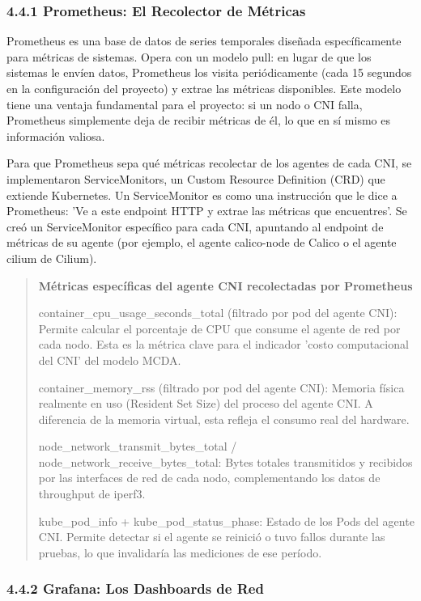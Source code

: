 \documentclass[journal]{IEEEtran}
\begin{document}
\subsubsection{4.4.1 Prometheus: El Recolector de Métricas}

Prometheus es una base de datos de series temporales diseñada específicamente para métricas de sistemas. Opera con un modelo pull: en lugar de que los sistemas le envíen datos, Prometheus los visita periódicamente (cada 15 segundos en la configuración del proyecto) y extrae las métricas disponibles. Este modelo tiene una ventaja fundamental para el proyecto: si un nodo o CNI falla, Prometheus simplemente deja de recibir métricas de él, lo que en sí mismo es información valiosa.

Para que Prometheus sepa qué métricas recolectar de los agentes de cada CNI, se implementaron ServiceMonitors, un Custom Resource Definition (CRD) que extiende Kubernetes. Un ServiceMonitor es como una instrucción que le dice a Prometheus: 'Ve a este endpoint HTTP y extrae las métricas que encuentres'. Se creó un ServiceMonitor específico para cada CNI, apuntando al endpoint de métricas de su agente (por ejemplo, el agente calico-node de Calico o el agente cilium de Cilium).

\begin{quote}
\textbf{Métricas específicas del agente CNI recolectadas por Prometheus}

container\_cpu\_usage\_seconds\_total (filtrado por pod del agente CNI): Permite calcular el porcentaje de CPU que consume el agente de red por cada nodo. Esta es la métrica clave para el indicador 'costo computacional del CNI' del modelo MCDA.

container\_memory\_rss (filtrado por pod del agente CNI): Memoria física realmente en uso (Resident Set Size) del proceso del agente CNI. A diferencia de la memoria virtual, esta refleja el consumo real del hardware.

node\_network\_transmit\_bytes\_total / node\_network\_receive\_bytes\_total: Bytes totales transmitidos y recibidos por las interfaces de red de cada nodo, complementando los datos de throughput de iperf3.

kube\_pod\_info + kube\_pod\_status\_phase: Estado de los Pods del agente CNI. Permite detectar si el agente se reinició o tuvo fallos durante las pruebas, lo que invalidaría las mediciones de ese período.
\end{quote}

\subsubsection{4.4.2 Grafana: Los Dashboards de Red}
\end{document}
